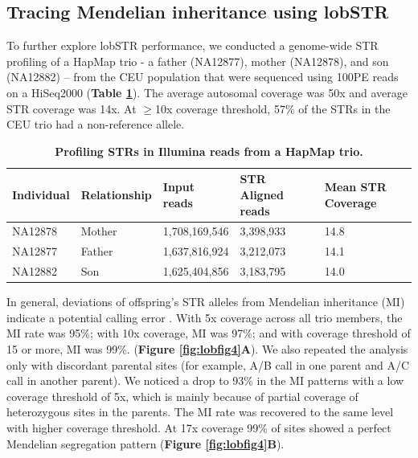 \subsection{Tracing Mendelian inheritance using lobSTR}
To further explore lobSTR performance, we conducted a genome-wide STR profiling of a HapMap trio - a father (NA12877), mother (NA12878), and son (NA12882) -- from the CEU population that were sequenced using 100PE reads on a HiSeq2000 (\textbf{Table \ref{tab:lobtab2}}). The average autosomal coverage was 50x and average STR coverage was 14x. At $\geq$10x coverage threshold, 57\% of the STRs in the CEU trio had a non-reference allele. 

\begin{table}[h!]
\centering
\label{tab:lobtab2}
\begin{tabular}{l l l l l}
\hline
Individual	& Relationship & Input reads	& STR Aligned reads	& Mean STR Coverage \\
\hline
NA12878 &	Mother	& 1,708,169,546 &	3,398,933 &	14.8 \\
NA12877	& Father &	1,637,816,924	&3,212,073 &	14.1 \\
NA12882	& Son	& 1,625,404,856 &	3,183,795 &	14.0 \\
\hline
\end{tabular}
\caption{\textbf{Profiling STRs in Illumina reads from a HapMap trio.}}
\end{table}

In general, deviations of offspring's STR alleles from Mendelian inheritance (MI) indicate a potential calling error \cite{EwenBahloTreloarEtAl2000}. With 5x coverage across all trio members, the MI rate was 95\%; with 10x coverage, MI was 97\%; and with coverage threshold of 15 or more, MI was 99\%. (\textbf{Figure \ref{fig:lobfig4}A}). We also repeated the analysis only with discordant parental sites (for example, A/B call in one parent and A/C call in another parent). We noticed a drop to 93\% in the MI patterns with a low coverage threshold of 5x, which is mainly because of partial coverage of heterozygous sites in the parents. The MI rate was recovered to the same level with higher coverage threshold. At 17x coverage 99\% of sites showed a perfect Mendelian segregation pattern (\textbf{Figure \ref{fig:lobfig4}B}). 

